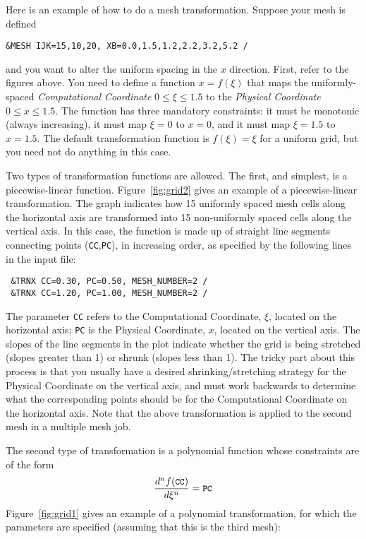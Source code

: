 \documentclass[11pt]{book}
\newcommand{\ct}{\tt\small}
\begin{document}
\noindent
Here is an example of how to do a mesh transformation. Suppose your mesh is defined

\footnotesize
\begin{verbatim}
&MESH IJK=15,10,20, XB=0.0,1.5,1.2,2.2,3.2,5.2 /
\end{verbatim}
\normalsize

\noindent
and you want to alter the uniform spacing in the $x$ direction.
First, refer to the figures above.
You need to define a function $x = f(\xi)$ that maps the uniformly-spaced
{\em Computational Coordinate} $0 \le \xi \le 1.5$
to the {\em Physical Coordinate} $0 \le x \le 1.5$.
The function has three mandatory constraints: it must be monotonic (always increasing),
it must map $\xi=0$ to $x=0$, and it must map $\xi=1.5$ to $x=1.5$.
The default transformation function is $f(\xi) = \xi$ for a uniform grid, but you need not do
anything in this case.

Two types of transformation functions are allowed. The first, and
simplest, is a piecewise-linear function.
Figure~\ref{fig:grid2} gives an example of a piecewise-linear transformation.
The graph indicates how 15 uniformly spaced mesh cells
along the horizontal axis are transformed into 15 non-uniformly spaced cells along the vertical axis.
In this case, the function is made up of straight line segments
connecting points ({\ct CC},{\ct PC}), in increasing order, as specified by the following lines in the input file:

\footnotesize
\begin{verbatim}
 &TRNX CC=0.30, PC=0.50, MESH_NUMBER=2 /
 &TRNX CC=1.20, PC=1.00, MESH_NUMBER=2 /
\end{verbatim} \normalsize

\noindent
The parameter {\ct CC} refers to the Computational Coordinate, $\xi$, located
on the horizontal axis; {\ct PC} is the Physical Coordinate, $x$, located on
the vertical axis.  The slopes of the
line segments in the plot indicate whether the grid is being stretched (slopes greater
than 1) or shrunk (slopes less than 1). The tricky part about this
process is that you usually have a desired shrinking/stretching strategy
for the Physical Coordinate on the vertical axis, and must work backwards
to determine what the corresponding points should be for the Computational
Coordinate on the horizontal axis. Note that the above transformation is
applied to the second mesh in a multiple mesh job.

The second type of transformation is
a polynomial function whose constraints are of the form
$$ \frac{d^n f(\hbox{\ct CC})}{d\xi^n} = \hbox{\ct PC}   $$
Figure~\ref{fig:grid1} gives an example of a polynomial transformation, for which
the parameters are specified (assuming that this is the third mesh):
\end{document}
